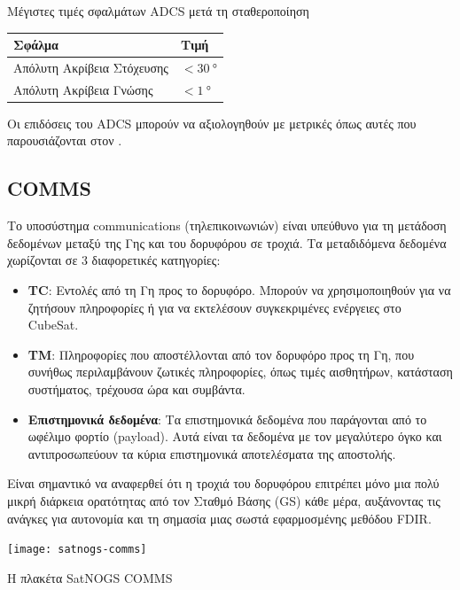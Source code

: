 \documentclass[a4paper,nobib]{tufte-book}
\begin{document}
\begin{margintable}
	\centering
	\caption[Μέγιστες τιμές σφαλμάτων ADCS μετά τη σταθεροποίηση]{Μέγιστες τιμές σφαλμάτων \ac{ADCS} μετά τη σταθεροποίηση}
	\label{tab:adcsape}
	\begin{tabular}{@{}ll@{}}
		\toprule
		Σφάλμα                      & Τιμή                    \\ \midrule
		Απόλυτη Ακρίβεια Στόχευσης & \( < \SI{30}{\degree} \) \\
		Απόλυτη Ακρίβεια Γνώσης    & \( < \SI{1}{\degree} \) 
	\end{tabular}
\end{margintable}

Οι επιδόσεις του \ac{ADCS} μπορούν να αξιολογηθούν με μετρικές όπως αυτές που παρουσιάζονται στον .

\subsection{\acf{COMMS}}

Το υποσύστημα communications (τηλεπικοινωνιών) είναι υπεύθυνο για τη μετάδοση δεδομένων μεταξύ της Γης και του δορυφόρου σε τροχιά. Τα μεταδιδόμενα δεδομένα χωρίζονται σε 3 διαφορετικές κατηγορίες\autocite{DDJF_TTC}:
\begin{itemize}
	\item \textbf{\acf{TC}}: Εντολές από τη Γη προς το δορυφόρο. Μπορούν να χρησιμοποιηθούν για να ζητήσουν πληροφορίες ή για να εκτελέσουν συγκεκριμένες ενέργειες στο CubeSat.
	\item \textbf{\acf{TM}}: Πληροφορίες που αποστέλλονται από τον δορυφόρο προς τη Γη, που συνήθως περιλαμβάνουν ζωτικές πληροφορίες, όπως τιμές αισθητήρων, κατάσταση συστήματος, τρέχουσα ώρα και συμβάντα.
	\item \textbf{Επιστημονικά δεδομένα}: Τα επιστημονικά δεδομένα που παράγονται από το ωφέλιμο φορτίο (payload). Αυτά είναι τα δεδομένα με τον μεγαλύτερο όγκο και αντιπροσωπεύουν τα κύρια επιστημονικά αποτελέσματα της αποστολής.
\end{itemize}

Είναι σημαντικό να αναφερθεί ότι η τροχιά του δορυφόρου επιτρέπει μόνο μια πολύ μικρή διάρκεια ορατότητας από τον Σταθμό Βάσης (\acf{GS}) κάθε μέρα, αυξάνοντας τις ανάγκες για αυτονομία και τη σημασία μιας σωστά εφαρμοσμένης μεθόδου \acs{FDIR}.

\begin{marginfigure}
	\texttt{[image: satnogs-comms]}
	\caption{Η πλακέτα SatNOGS COMMS}
\end{marginfigure}
\end{document}
